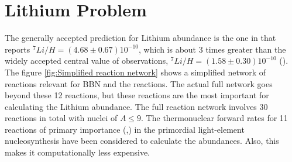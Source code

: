 \documentclass[11pt]{article}
\numberwithin{equation}{section}
\begin{document}
\section{Lithium Problem}
\label{sec: Lithium Problem}
The generally accepted prediction for Lithium abundance is the one in \cite{cyburt2016big} that reports $^{7}Li/H = (4.68 \pm 0.67)10^{-10}$, which is about 3 times greater than the widely accepted central value of observations, $^{7}Li/H = (1.58 \pm 0.30)10^{-10}$ (\cite{PITROU20181}).
The figure \ref{fig:Simplified reaction network} shows a simplified network of reactions relevant for BBN and the reactions. The actual full network goes beyond these 12 reactions, but these reactions are the most important for calculating the Lithium abundance.  %
The full reaction network involves 30 reactions in total with nuclei of $A\leq 9$. The
thermonuclear forward rates for 11 reactions of primary importance (\cite{smith1993experimental},\cite{Kusakabe:2018dzx}) in the primordial light-element nucleosynthesis have been considered to calculate the abundances. Also, this makes it computationally less expensive. 
\end{document}
